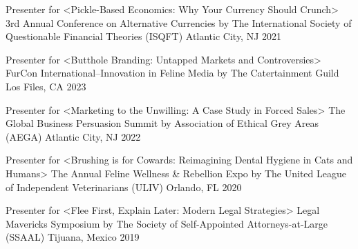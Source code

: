 

\begin{cventries}

  \cventry
    {Presenter for <Pickle-Based Economics: Why Your Currency Should Crunch>} %
    {3rd Annual Conference on Alternative Currencies by The International Society of Questionable Financial Theories (ISQFT)} %
    {Atlantic City, NJ} %
    {2021} %
    {
    }

  \cventry
    {Presenter for <Butthole Branding: Untapped Markets and Controversies>} %
    {FurCon International--Innovation in Feline Media by The Catertainment Guild} %
    {Los Files, CA} %
    {2023} %
    {
    }

  \cventry
    {Presenter for <Marketing to the Unwilling: A Case Study in Forced Sales>} %
    {The Global Business Persuasion Summit by Association of Ethical Grey Areas (AEGA)} %
    {Atlantic City, NJ} %
    {2022} %
    {
    }

  \cventry
    {Presenter for <Brushing is for Cowards: Reimagining Dental Hygiene in Cats and Humans>} %
    {The Annual Feline Wellness \& Rebellion Expo by The United League of Independent Veterinarians (ULIV)} %
    {Orlando, FL} %
    {2020} %
    {
    }

  \cventry
    {Presenter for <Flee First, Explain Later: Modern Legal Strategies>} %
    {Legal Mavericks Symposium by The Society of Self-Appointed Attorneys-at-Large (SSAAL)} %
    {Tijuana, Mexico} %
    {2019} %
    {
    }
\end{cventries}

